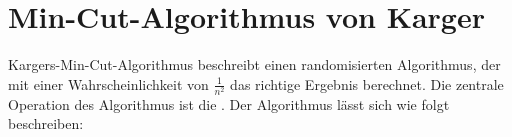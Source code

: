 \documentclass{scrartcl}%
\begin{document}
    \section*{Min-Cut-Algorithmus von Karger}
    \label{sec:kargersMincutAlgorithmus}

    Kargers-Min-Cut-Algorithmus beschreibt einen randomisierten Algorithmus, der mit einer
    Wahrscheinlichkeit von $\frac{1}{n^2}$ das richtige Ergebnis berechnet.
    Die zentrale Operation des Algorithmus ist die .
    Der Algorithmus lässt sich wie folgt beschreiben:

    \begin{figure}[H]
        \begin{algorithmic}
            \ENDFOR
            \STATE
        \end{algorithmic}
    \end{figure}
\end{document}
